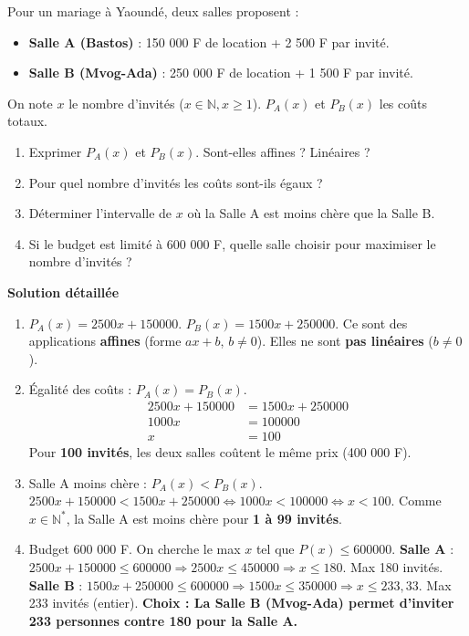 \documentclass[11pt]{article}
\begin{document}
\begin{exoresolu}
    Pour un mariage à Yaoundé, deux salles proposent :
    \begin{itemize}
        \item \textbf{Salle A (Bastos)} : 150 000 F de location + 2 500 F par invité.
        \item \textbf{Salle B (Mvog-Ada)} : 250 000 F de location + 1 500 F par invité.
    \end{itemize}
    On note $x$ le nombre d'invités ($x \in \mathbb{N}, x \ge 1$). $P_A(x)$ et $P_B(x)$ les coûts totaux.
    \begin{enumerate}
        \item Exprimer $P_A(x)$ et $P_B(x)$. Sont-elles affines ? Linéaires ?
        \item Pour quel nombre d'invités les coûts sont-ils égaux ?
        \item Déterminer l'intervalle de $x$ où la Salle A est moins chère que la Salle B.
        \item Si le budget est limité à 600 000 F, quelle salle choisir pour maximiser le nombre d'invités ?
    \end{enumerate}
    \tcblower
    \textbf{Solution détaillée}
    \begin{enumerate}
        \item $P_A(x) = 2500x + 150000$. $P_B(x) = 1500x + 250000$.
        Ce sont des applications \textbf{affines} (forme $ax+b$, $b \neq 0$). Elles ne sont \textbf{pas linéaires} ($b \neq 0$).
        \item Égalité des coûts : $P_A(x) = P_B(x)$.
        \begin{align*}
            2500x + 150000 &= 1500x + 250000 \\
            1000x &= 100000 \\
            x &= 100
        \end{align*}
        Pour \textbf{100 invités}, les deux salles coûtent le même prix (400 000 F).
        \item Salle A moins chère : $P_A(x) < P_B(x)$.
        $2500x + 150000 < 1500x + 250000 \Leftrightarrow 1000x < 100000 \Leftrightarrow x < 100$.
        Comme $x \in \mathbb{N}^*$, la Salle A est moins chère pour \textbf{1 à 99 invités}.
        \item Budget 600 000 F. On cherche le max $x$ tel que $P(x) \le 600000$.
        \textbf{Salle A} : $2500x + 150000 \le 600000 \Rightarrow 2500x \le 450000 \Rightarrow x \le 180$. Max 180 invités.
        \textbf{Salle B} : $1500x + 250000 \le 600000 \Rightarrow 1500x \le 350000 \Rightarrow x \le 233,33$. Max 233 invités (entier).
        \textbf{Choix : La Salle B (Mvog-Ada) permet d'inviter 233 personnes contre 180 pour la Salle A.}
    \end{enumerate}
\end{exoresolu}
\end{document}

